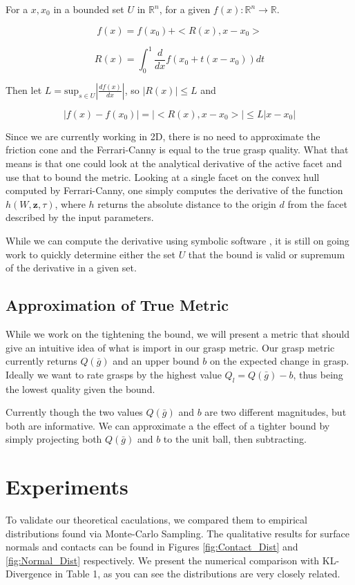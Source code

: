 \documentclass[letterpaper, 10 pt, conference]{ieeeconf}  %
\begin{document}
For a $x,x_0$ in a bounded set $U$ in $\mathbb{R}^n$, for a given $f(x):\mathbb{R}^n \rightarrow \mathbb{R}$. 

\[
  f(x) = f(x_0) + <R(x),x-x_0>
\]

\[
  R(x) = \int_0^1 \frac{d}{dx}f(x_0+t(x-x_0)) dt
\]

Then let $L = \mbox{sup}_{s \in U} |\frac{df(x)}{dx} |$, so $|R(x)| \leq L$ and 

\[
  |f(x)-f(x_0)| = |<R(x),x-x_0>| \leq L |x-x_0|
\]


Since we are currently working in 2D, there is no need to approximate the friction cone and the Ferrari-Canny is equal to the true grasp quality. What that means is that one could look at the analytical derivative of the active facet and use that to bound the metric. Looking at a single facet on the convex hull computed by Ferrari-Canny, one simply computes the derivative of the function $h(W,\textbf{z},\tau)$, where $h$ returns the absolute distance to the origin $d$ from the facet described by the input parameters. 

While we can compute the derivative using symbolic software \cite{SymPy}, it is still on going work to quickly determine either the set $U$ that the bound is valid or supremum of the derivative in a given set.    

\subsection{Approximation of True Metric}
While we work on the tightening the bound, we will present a metric that should give an intuitive idea of what is import in our grasp metric. Our grasp metric currently returns $Q(\bar{g})$ and an upper bound $b$ on the expected change in grasp. Ideally we want to rate grasps by the highest value $Q_l = Q(\bar{g}) - b$, thus being the lowest quality given the bound. 

Currently though the two values $Q(\bar{g})$ and $b$ are two different magnitudes, but both are informative. We can approximate a the effect of a tighter bound by simply projecting both $Q(\bar{g})$ and $b$ to the unit ball, then subtracting. 

\section{Experiments}

To validate our theoretical caculations, we compared them to empirical distributions found via Monte-Carlo Sampling. The qualitative results for surface normals and contacts can be found in Figures \ref{fig:Contact_Dist} and \ref{fig:Normal_Dist} respectively. We present the numerical comparison with KL-Divergence in Table 1, as you can see the distributions are very closely related. 
\end{document}
